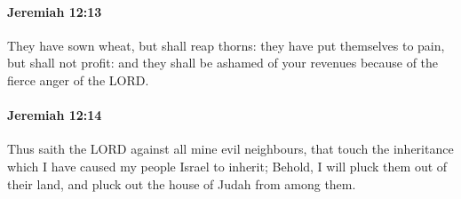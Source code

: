 		\paragraph{Jeremiah 12:13} %
			\label{JEREMIAH-12-13}

			They have sown wheat, but shall reap thorns: they have put themselves to pain, but shall not profit: and they shall be ashamed of your revenues because of the fierce anger of the LORD.


		\paragraph{Jeremiah 12:14} %
			\label{JEREMIAH-12-14}

			Thus saith the LORD against all mine evil neighbours, that touch the inheritance which I have caused my people Israel to inherit; Behold, I will pluck them out of their land, and pluck out the house of Judah from among them.

